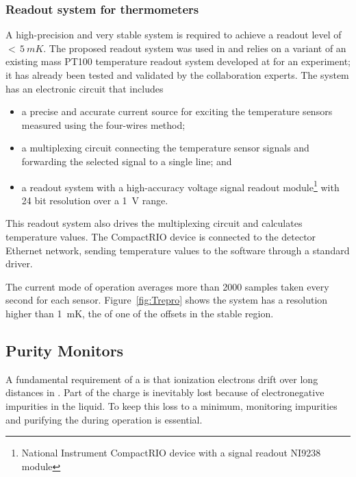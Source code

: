 \subsubsection{Readout system for thermometers}
\label{sec:fdgen-slow-cryo-therm-readout}

A %
high-precision and very stable system is required to achieve a readout level of $<\,\SI{5}{mK}$.
The proposed readout system was used in  and relies on a variant of an existing mass PT100 temperature readout system developed at
 for an  
experiment; it has already been tested and validated by the collaboration experts. The system has an electronic circuit that includes
\begin{itemize}
\item a precise and accurate current source for exciting the temperature sensors measured using the four-wires method;
\item a multiplexing circuit connecting the temperature sensor signals and forwarding the selected signal to a single line; and 
\item a readout system  with a high-accuracy voltage signal readout module\footnote{National Instrument CompactRIO\texttrademark{} device  with a signal readout NI9238\texttrademark{} module} with 24 bit resolution over a \SI{1}{V} range.
\end{itemize}
This readout system also drives the multiplexing circuit and calculates temperature values. The CompactRIO device is connected to the detector Ethernet network, sending temperature values to the  software through a standard  driver.


The current mode of operation averages more than \num{2000} samples taken every second for each sensor. 
Figure~\ref{fig:Trepro} shows the system has a resolution higher than 
\SI{1}{mK}, the  of one of the offsets in the stable region.




\subsection{Purity Monitors}
\label{sec:fdgen-slow-cryo-purity-mon}
A fundamental requirement of a   is that ionization electrons drift over long distances in . Part of the charge is inevitably lost because of electronegative impurities in the liquid. To keep this loss to a minimum, monitoring impurities and purifying the  during operation is essential.


